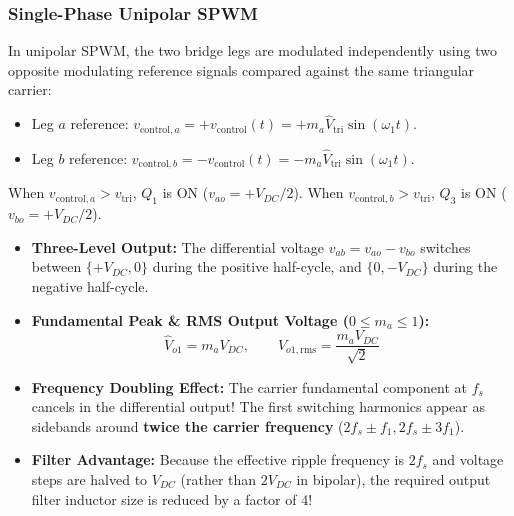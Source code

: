 \subsubsection{Single-Phase Unipolar SPWM}
In unipolar SPWM, the two bridge legs are modulated independently using two opposite modulating reference signals compared against the same triangular carrier:
\begin{itemize}
  \item Leg $a$ reference: $v_{\mathrm{control},a} = +v_{\mathrm{control}}(t) = +m_a \hat{V}_{\mathrm{tri}} \sin(\omega_1 t)$.
  \item Leg $b$ reference: $v_{\mathrm{control},b} = -v_{\mathrm{control}}(t) = -m_a \hat{V}_{\mathrm{tri}} \sin(\omega_1 t)$.
\end{itemize}
When $v_{\mathrm{control},a} > v_{\mathrm{tri}}$, $Q_1$ is ON ($v_{ao} = +V_{DC}/2$). When $v_{\mathrm{control},b} > v_{\mathrm{tri}}$, $Q_3$ is ON ($v_{bo} = +V_{DC}/2$).
\begin{itemize}
  \item \textbf{Three-Level Output:} The differential voltage $v_{ab} = v_{ao} - v_{bo}$ switches between $\{+V_{DC}, 0\}$ during the positive half-cycle, and $\{0, -V_{DC}\}$ during the negative half-cycle.
  \item \textbf{Fundamental Peak \& RMS Output Voltage ($0 \le m_a \le 1$):}
  \begin{equation}
  \hat{V}_{o1} = m_a V_{DC}, \qquad V_{o1,\mathrm{rms}} = \frac{m_a V_{DC}}{\sqrt{2}}
  \end{equation}
  \item \textbf{Frequency Doubling Effect:} The carrier fundamental component at $f_s$ cancels in the differential output! The first switching harmonics appear as sidebands around \textbf{twice the carrier frequency} ($2 f_s \pm f_1, 2 f_s \pm 3 f_1$).
  \item \textbf{Filter Advantage:} Because the effective ripple frequency is $2 f_s$ and voltage steps are halved to $V_{DC}$ (rather than $2 V_{DC}$ in bipolar), the required output filter inductor size is reduced by a factor of 4!
\end{itemize}

